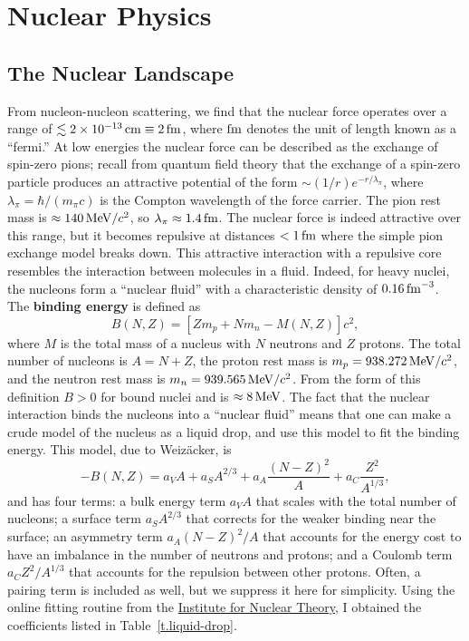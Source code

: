 \chapter{Nuclear Physics}

\section{The Nuclear Landscape}

From nucleon-nucleon scattering, we find that the nuclear force operates over a range of $\lesssim 2\times 10^{-13}\,\mathrm{c}\mathrm{m} \equiv 2\,\mathrm{fm}$, where $\mathrm{fm}$ denotes the unit of length known as a ``fermi.''  At low energies the nuclear force can be described as the exchange of spin-zero pions; recall from quantum field theory that  the exchange of a spin-zero particle produces an attractive potential of the form $\sim (1/r)e^{-r/\lambda_{\pi}}$, where $\lambda_{\pi} = \hbar/(m_{\pi}c)$ is the Compton wavelength of the force carrier. The pion rest mass is $\approx 140\,\mathrm{M}\mathrm{eV}/c^{2}$, so $\lambda_{\pi} \approx 1.4\,\mathrm{fm}$.  The nuclear force is indeed attractive over this range,  but it becomes repulsive at distances $< 1\,\mathrm{fm}$ where the simple pion exchange model breaks down.  This attractive interaction with a repulsive core resembles the interaction between molecules in a fluid.  Indeed, for heavy nuclei, the nucleons form a ``nuclear fluid'' with a characteristic density of $0.16\,\mathrm{fm}^{-3}$.  The \textbf{binding energy} is defined as
\begin{equation}\label{e.binding-energy-def}
B(N,Z) = \left[Z m_{p} + N m_{n} - M(N,Z)\right] c^{2},
\end{equation}
where $M$ is the total mass of a nucleus with $N$ neutrons and $Z$ protons. The total number of nucleons is $A = N+Z$, the proton rest mass is $m_{p} = 938.272\,\mathrm{M}\mathrm{eV}/c^{2}$, and the neutron rest mass is $m_{n} = 939.565\,\mathrm{M}\mathrm{eV}/c^{2}$. From the form of this definition $B > 0$ for bound nuclei and is $\approx 8\,\mathrm{M}\mathrm{eV}$. The fact that the nuclear interaction binds the nucleons into a ``nuclear fluid'' means that one can make a crude model of the nucleus as a liquid drop, and use this model to fit the binding energy.
This model, due to Weiz\"acker, is
\begin{equation}\label{e.weizacker-fmla}
-B(N, Z) = a_{V} A + a_{S}A^{2/3} + a_{A}\frac{(N-Z)^{2}}{A} + a_{C}\frac{Z^{2}}{A^{1/3}},
\end{equation}
and has four terms: a bulk energy term $a_{V}A$ that scales with the total number of nucleons; a surface term $a_{S}A^{2/3}$ that corrects for the weaker binding near the surface; an asymmetry term $a_{A}(N-Z)^{2}/A$ that accounts for the energy cost to have an imbalance in the number of neutrons and protons; and a Coulomb term $a_{C}Z^{2}/A^{1/3}$ that accounts for the repulsion between other protons.  Often, a pairing term is included as well, but we suppress it here for simplicity.
Using the online fitting routine from the \href{http://128.95.95.61/~intuser/ld.html}{Institute for Nuclear Theory}, I obtained the coefficients listed in Table~\ref{t.liquid-drop}.

